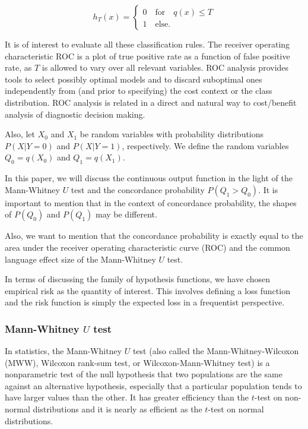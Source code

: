 \begin{equation}
\label{eq:ht}
h_T(x) = 
\begin{cases}
0 \quad \mbox{for} \quad q(x) \leq T\\
1 \quad \mbox{else}.
\end{cases}
\end{equation}

It is of interest to evaluate all these classification rules.  The receiver operating characteristic ROC is a plot of true positive rate as a function of false positive rate, as $T$ is allowed to vary over all relevant variables.  ROC analysis provides tools to select possibly optimal models and to discard suboptimal ones independently from (and prior to specifying) the cost context or the class distribution. ROC analysis is related in a direct and natural way to cost/benefit analysis of diagnostic decision making.




Also, let $X_0$ and $X_1$ be random variables with probability distributions $P(X | Y = 0)$ and $P(X | Y = 1)$, respectively.  We define the random variables $Q_0 = q(X_0)$ and $Q_1 = q(X_1)$.

In this paper, we will discuss the continuous output function in the light of the Mann-Whitney $U$ test and the concordance probability $P(Q_1 > Q_0)$.  It is important to mention that in the context of concordance probability, the shapes of $P(Q_0)$ and $P(Q_1)$ may be different. 

Also, we want to mention that the concordance probability is exactly equal to the area under the receiver operating characteristic curve (ROC) and the common language effect size of the Mann-Whitney $U$ test.

In terms of discussing the family of hypothesis functions, we have chosen empirical risk as the quantity of interest.  This involves defining a loss function and the risk function is simply the expected loss in a frequentist perspective.

\subsubsection{Mann-Whitney $U$ test}
\label{sec:U}

In statistics, the Mann-Whitney $U$ test (also called the Mann-Whitney-Wilcoxon (MWW), Wilcoxon rank-sum test, or Wilcoxon-Mann-Whitney test) is a nonparametric test of the null hypothesis that two populations are the same against an alternative hypothesis, especially that a particular population tends to have larger values than the other.  It has greater efficiency than the $t$-test on non-normal distributions and it is nearly as efficient as the $t$-test on normal distributions.

